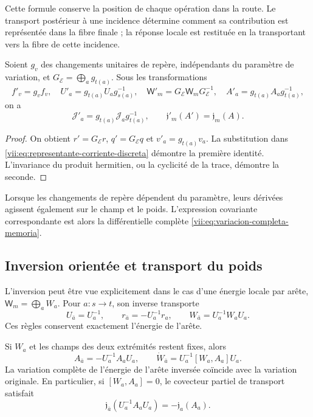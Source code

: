 Cette formule conserve la position de chaque opération dans la route.
Le transport postérieur à une incidence détermine comment sa contribution
est représentée dans la fibre finale ; la réponse locale est restituée
en la transportant vers la fibre de cette incidence.

\begin{proposition}
\label{vii:prop:covariancia-corriente-memoria}
Soient \(g_v\) des changements unitaires de repère, indépendants du paramètre
de variation, et \(G_{\mathcal E}=\bigoplus_a g_{t(a)}\).
Sous les transformations
\[
 f'_v=g_vf_v,\quad U'_a=g_{t(a)}U_ag_{s(a)}^{-1},\quad
 \mathsf W'_m=G_{\mathcal E}\mathsf W_mG_{\mathcal E}^{-1},\quad
 A'_a=g_{t(a)}A_ag_{t(a)}^{-1},
\]
on a
\begin{equation}
 \mathcal J'_a=g_{t(a)}\mathcal J_ag_{t(a)}^{-1},
 \qquad \mathfrak j'_m(A')=\mathfrak j_m(A).
 \label{vii:eq:covariancia-respuesta}
\end{equation}
\end{proposition}

\begin{proof}
On obtient \(r'=G_{\mathcal E}r\), \(q'=G_{\mathcal E}q\) et \(v'_a=g_{t(a)}v_a\). La substitution dans \eqref{vii:eq:representante-corriente-discreta} démontre la première identité. L'invariance du produit hermitien, ou la cyclicité de la trace, démontre la seconde.
\end{proof}

Lorsque les changements de repère dépendent du paramètre, leurs dérivées
agissent également sur le champ et le poids. L'expression covariante
correspondante est alors la différentielle complète
\eqref{vii:eq:variacion-completa-memoria}.

\subsection{Inversion orientée et transport du poids}
\label{vii:subsec:inversion-respuesta}

L'inversion peut être vue explicitement dans le cas d'une énergie locale par arête, \(\mathsf W_m=\bigoplus_a W_a\). Pour \(a:s\to t\), son inverse transporte
\[
 U_{\bar a}=U_a^{-1},\qquad
 r_{\bar a}=-U_a^{-1}r_a,\qquad
 W_{\bar a}=U_a^{-1}W_aU_a.
\]
Ces règles conservent exactement l'énergie de l'arête.

\begin{proposition}
\label{vii:prop:inversion-respuesta}
Si \(W_a\) et les champs des deux extrémités restent fixes, alors
\[
 A_{\bar a}=-U_a^{-1}A_aU_a,\qquad
 \dot W_{\bar a}=U_a^{-1}[W_a,A_a]U_a.
\]
La variation complète de l'énergie de l'arête inversée coïncide avec
la variation originale. En particulier, si \([W_a,A_a]=0\), le covecteur partiel
de transport satisfait
\begin{equation}
 \mathfrak j_{\bar a}(U_a^{-1}A_aU_a)
 =-\mathfrak j_a(A_a).
 \label{vii:eq:imparidad-transporte}
\end{equation}
\end{proposition}


